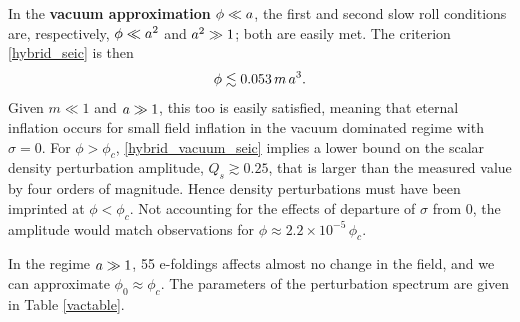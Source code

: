 
In the \textbf{vacuum approximation} $\phi \ll a$, the first and second slow roll conditions are, respectively, $\phi \ll a^2$ and $a^2 \gg 1$; both are easily met.  
The criterion \eqref{hybrid_seic} is then 
\begin{equation} \phi \lesssim 0.053 \, m \, a^3. \label{hybrid_vacuum_seic} \end{equation}
Given $m \ll 1$ and $a \gg 1$, this too is easily satisfied, meaning that eternal inflation occurs for small field inflation in the vacuum dominated regime with $\sigma = 0$.
For $\phi > \phi_c$, \eqref{hybrid_vacuum_seic} implies a lower bound on the scalar density perturbation amplitude,
$ Q_s \gtrsim 0.25 $, %
that is larger than the measured value by four orders of magnitude.
Hence density perturbations must have been imprinted at $\phi < \phi_c$.  Not accounting for the effects of departure of $\sigma$ from $0$, the amplitude would match observations for $\phi \approx 2.2 \times 10^{-5} \, \phi_c$.

In the regime $a \gg 1$, 55 e-foldings affects almost no change in the field, and we can approximate $\phi_0 \approx \phi_c$.  
The parameters of the perturbation spectrum are given in Table \ref{vactable}.


